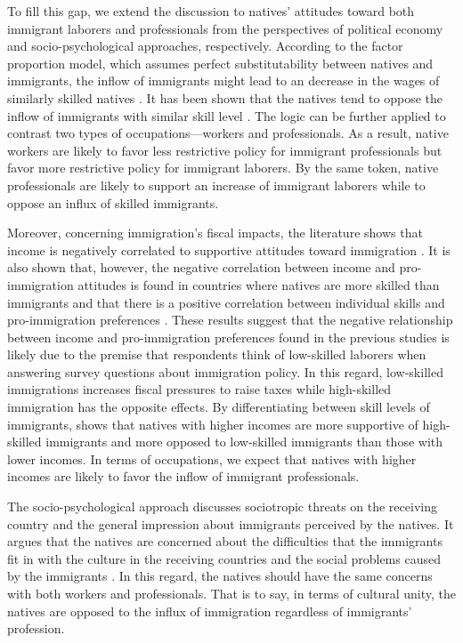 \documentclass[12pt]{article}
\begin{document}
To fill this gap, we extend the discussion to natives' attitudes toward both immigrant laborers and professionals from the perspectives of political economy and socio-psychological approaches, respectively. According to the factor proportion model, which assumes perfect substitutability between natives and immigrants, the inflow of immigrants might lead to an decrease in the wages of similarly skilled natives \citep{ScheveSlaughter2001}. It has been shown that the natives tend to oppose the inflow of immigrants with similar skill level \citep{HansonScheveSlaughter2007}. The logic can be further applied to contrast two types of occupations---workers and professionals. As a result, native workers are likely to favor less restrictive policy for immigrant professionals but favor more restrictive policy for immigrant laborers. By the same token, native professionals are likely to support an increase of immigrant laborers while to oppose an influx of skilled immigrants. 


Moreover, concerning immigration's fiscal impacts, the literature shows that income is negatively correlated to supportive attitudes toward immigration \citep{DustmannPreston2006, DustmannPreston2007}. It is also shown that, however, the negative correlation between income and pro-immigration attitudes is found in countries where natives are more skilled than immigrants and that there is a positive correlation between individual skills and pro-immigration preferences \citep{FacchiniMayda2006}. These results suggest that the negative relationship between income and pro-immigration preferences found in the previous studies is likely due to the premise that respondents think of low-skilled laborers when answering survey questions about immigration policy. In this regard, low-skilled immigrations increases fiscal pressures to raise taxes while high-skilled immigration has the opposite effects. By differentiating between skill levels of immigrants, \cite{Hansonetal2007} shows that natives with higher incomes are more supportive of high-skilled immigrants and more opposed to low-skilled immigrants than those with lower incomes. In terms of occupations, we expect that natives with higher incomes are likely to favor the inflow of immigrant professionals.


The socio-psychological approach discusses sociotropic threats on the receiving country and the general impression about immigrants perceived by the natives. It argues that the natives are concerned about the difficulties that the immigrants fit in with the culture in the receiving countries and the social problems caused by the immigrants \citep[e.g.,][]{Snidermanetal2004}. In this regard, the natives should have the same concerns with both workers and professionals. That is to say, in terms of cultural unity, the natives are opposed to the influx of immigration regardless of immigrants' profession.
\end{document}
